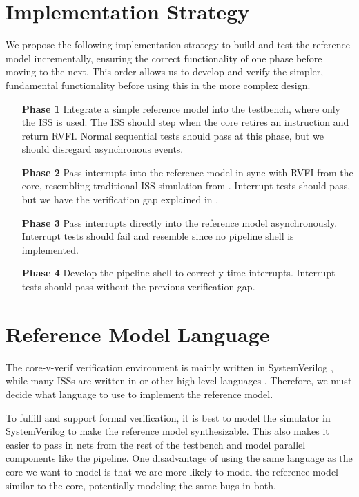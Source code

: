 \section{Implementation Strategy}
\label{sec:strategy}

We propose the following implementation strategy to build and test the reference model incrementally, ensuring the correct functionality of one phase before moving to the next. This order allows us to develop and verify the simpler, fundamental functionality before using this in the more complex design.

\begin{enumerate}[leftmargin=20mm]
    \item[\textbf{Phase 1}] Integrate a simple reference model into the testbench, where only the ISS is used. The ISS should step when the core retires an instruction and return RVFI. Normal sequential tests should pass at this phase, but we should disregard asynchronous events. \label{phase:iss}
    \item[\textbf{Phase 2}] Pass interrupts into the reference model in sync with RVFI from the core, resembling traditional ISS simulation from . Interrupt tests should pass, but we have the verification gap explained in . \label{phase:rvfi_interrupt}
    \item[\textbf{Phase 3}] Pass interrupts directly into the reference model asynchronously. Interrupt tests should fail and resemble  since no pipeline shell is implemented.\label{phase:async_fail}
    \item[\textbf{Phase 4}] Develop the pipeline shell to correctly time interrupts. Interrupt tests should pass without the previous verification gap. \label{phase:pipeline_shell}
\end{enumerate}




\section{Reference Model Language}

The core-v-verif verification environment is mainly written in SystemVerilog \cite{openhwgroupOpenhwgroupCorevverif2023}, while many ISSs are written in \cpp or other high-level languages \cite{SpikeRISCVISA2023}.
Therefore, we must decide what language to use to implement the reference model.

To fulfill  and support formal verification, it is best to model the simulator in SystemVerilog to make the reference model synthesizable. This also makes it easier to pass in nets from the rest of the testbench and model parallel components like the pipeline. One disadvantage of using the same language as the core we want to model is that we are more likely to model the reference model similar to the core, potentially modeling the same bugs in both. 

